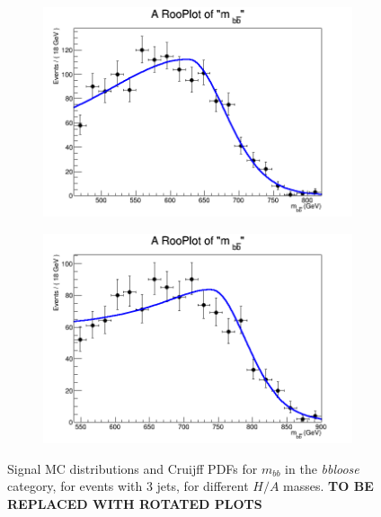 \begin{figure}[phtb!]
\begin{center}
  \begin{subfigure}[$m_{A}=700$ GeV]{0.4\textwidth}\includegraphics[width=\textwidth]{FitResults/images/fitMC_bAbb700_5.png}\end{subfigure}
  \begin{subfigure}[$m_{A}=800$ GeV]{0.4\textwidth}\includegraphics[width=\textwidth]{FitResults/images/fitMC_bAbb800_5.png}\end{subfigure}
  \caption{Signal MC distributions and Cruijff PDFs for $m_{bb}$ in the {\it bbloose} category, 
  for events with 3 jets, for different $H/A$ masses. 
      \textbf{TO BE REPLACED WITH ROTATED PLOTS}  \label{fig:signalPDFs_4j_bbloose}}
    \end{center}
\end{figure}


